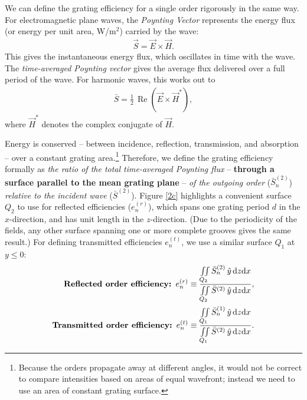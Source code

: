 We can define the grating efficiency for a single order rigorously in the same way.  For electromagnetic plane waves, the \emph{Poynting Vector} represents the energy flux (or energy per unit area, W/m$^2$) carried by the wave:
\begin{align}
\vec S = \vec E \times \vec H.
\end{align}
This gives the instantaneous energy flux, which oscillates in time with the wave.  The \emph{time-averaged Poynting vector} gives the average flux delivered over a full period of the wave.  For harmonic waves, this works out to
\begin{align}
 \bar S  = \frac{1}{2}\, \operatorname{Re} \left( \vec E \times \vec H^\ast \right),
\end{align}
where $\vec H^\ast$ denotes the complex conjugate of $\vec H$.

Energy is conserved -- between incidence, reflection, transmission, and absorption -- over a constant grating area.\footnote{Because the orders propagate away at different angles, it would not be correct to compare intensities based on areas of equal wavefront; instead we need to use an area of constant grating surface.}  Therefore, we define the grating efficiency formally as \emph{the ratio of the total time-averaged Poynting flux} -- \textbf{through a surface parallel to the mean grating plane} -- \emph{of the outgoing order }($\bar S_n^{(2)}$) \emph{relative to the incident wave} ($\bar S^{(2)}$).  Figure \ref{2c} highlights a convenient surface $Q_2$ to use for reflected efficiencies ($e_n^{(r)}$), which spans one grating period $d$ in the $x$-direction, and has unit length in the $z$-direction.  (Due to the periodicity of the fields, any other surface spanning one or more complete grooves gives the same result.)  For defining transmitted efficiencies $e_n^{(t)}$, we use a similar surface $Q_1$ at $y\leq0$:
\begin{align}
\textrm{\textbf{Reflected order efficiency: }}e_n^{(r)} &\equiv \frac{\iint \limits_{Q_2} \bar S_n^{(2)} \, \hat y \, \mathrm{d} z \mathrm{d} x}{ \iint \limits_{Q_2} \bar S^{(2)} \, \hat y \, \mathrm{d} z \mathrm{d} x}, \\
\textrm{\textbf{Transmitted order efficiency: }}e_n^{(t)} &\equiv\frac{\iint \limits_{Q_1} \bar S_n^{(1)}\, \hat y \, \mathrm{d} z \mathrm{d} x}{ \iint \limits_{Q_1} \bar S^{(2)}\, \hat y \, \mathrm{d} z \mathrm{d} x}.
\end{align}
          
